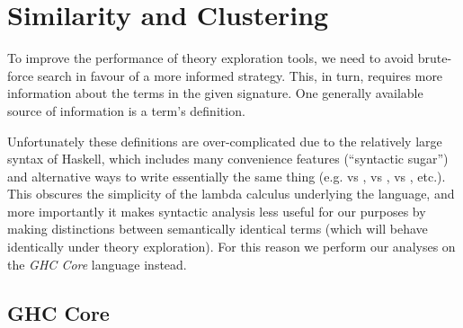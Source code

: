\chapter{Similarity and Clustering}
\label{sec:recurrentclustering}

To improve the performance of theory exploration tools, we need to avoid
brute-force search in favour of a more informed strategy. This, in turn,
requires more information about the terms in the given signature. One
generally available source of information is a term's definition.

Unfortunately these definitions are over-complicated due to the relatively large
syntax of Haskell, which includes many convenience features (``syntactic
sugar'') and alternative ways to write essentially the same thing (e.g.
 vs ,  vs ,  vs
, etc.). This obscures the simplicity of the lambda calculus
underlying the language, and more importantly it makes syntactic analysis less
useful for our purposes by making distinctions between semantically identical
terms (which will behave identically under theory exploration). For this reason
we perform our analyses on the \emph{GHC Core} language instead.

\section{GHC Core}\label{sec:core}
\label{sec:ghccore}

